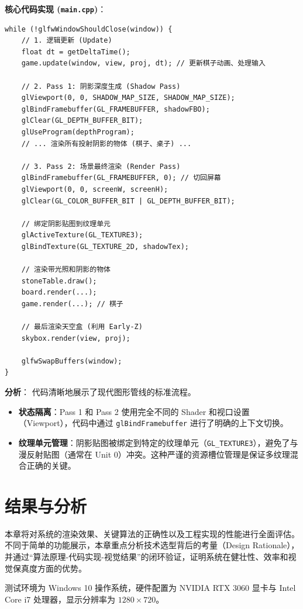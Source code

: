 \documentclass[a4paper]{article}
\begin{document}
\textbf{核心代码实现 (\texttt{main.cpp})}：
\begin{lstlisting}[caption={主渲染循环伪代码}]
while (!glfwWindowShouldClose(window)) {
    // 1. 逻辑更新 (Update)
    float dt = getDeltaTime();
    game.update(window, view, proj, dt); // 更新棋子动画、处理输入

    // 2. Pass 1: 阴影深度生成 (Shadow Pass)
    glViewport(0, 0, SHADOW_MAP_SIZE, SHADOW_MAP_SIZE);
    glBindFramebuffer(GL_FRAMEBUFFER, shadowFBO);
    glClear(GL_DEPTH_BUFFER_BIT);
    glUseProgram(depthProgram);
    // ... 渲染所有投射阴影的物体 (棋子、桌子) ...
    
    // 3. Pass 2: 场景最终渲染 (Render Pass)
    glBindFramebuffer(GL_FRAMEBUFFER, 0); // 切回屏幕
    glViewport(0, 0, screenW, screenH);
    glClear(GL_COLOR_BUFFER_BIT | GL_DEPTH_BUFFER_BIT);
    
    // 绑定阴影贴图到纹理单元
    glActiveTexture(GL_TEXTURE3); 
    glBindTexture(GL_TEXTURE_2D, shadowTex);
    
    // 渲染带光照和阴影的物体
    stoneTable.draw();
    board.render(...);
    game.render(...); // 棋子
    
    // 最后渲染天空盒 (利用 Early-Z)
    skybox.render(view, proj);
    
    glfwSwapBuffers(window);
}
\end{lstlisting}

\textbf{分析}：
代码清晰地展示了现代图形管线的标准流程。
\begin{itemize}
    \item \textbf{状态隔离}：Pass 1 和 Pass 2 使用完全不同的 Shader 和视口设置（Viewport），代码中通过 \texttt{glBindFramebuffer} 进行了明确的上下文切换。
    \item \textbf{纹理单元管理}：阴影贴图被绑定到特定的纹理单元（\texttt{GL\_TEXTURE3}），避免了与漫反射贴图（通常在 Unit 0）冲突。这种严谨的资源槽位管理是保证多纹理混合正确的关键。
\end{itemize}

\section{结果与分析}

本章将对系统的渲染效果、关键算法的正确性以及工程实现的性能进行全面评估。不同于简单的功能展示，本章重点分析技术选型背后的考量（Design Rationale），并通过“算法原理-代码实现-视觉结果”的闭环验证，证明系统在健壮性、效率和视觉保真度方面的优势。

测试环境为 Windows 10 操作系统，硬件配置为 NVIDIA RTX 3060 显卡与 Intel Core i7 处理器，显示分辨率为 $1280 \times 720$。
\end{document}
